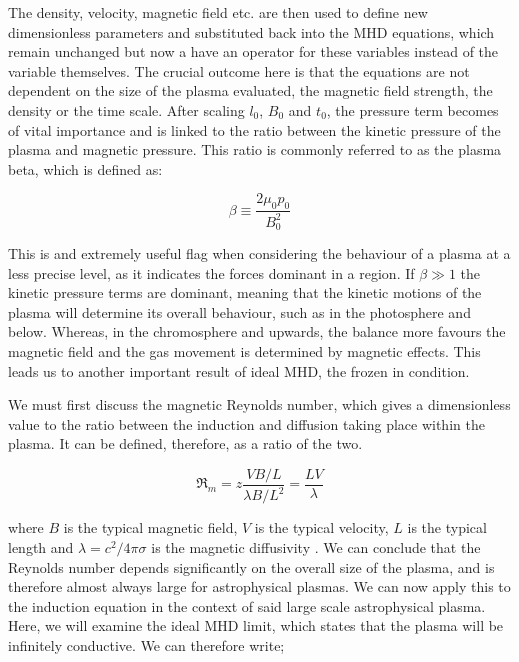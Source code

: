 \noindent The density, velocity, magnetic field etc. are then used to define new dimensionless parameters and substituted back into the MHD equations, which remain unchanged but now a have an operator for these variables instead of the variable themselves.
The crucial outcome here is that the equations are not dependent on the size of the plasma evaluated, the magnetic field strength, the density or the time scale.
After scaling $l_0$, $B_0$ and $t_0$, the pressure term becomes of vital importance and is linked to the ratio between the kinetic pressure of the plasma and magnetic pressure.
This ratio is commonly referred to as the plasma beta, which is defined as:

\begin{equation}
	\beta \equiv \frac{2\mu_0p_0}{B_0^2}
\end{equation} 

\noindent This is and extremely useful flag when considering the behaviour of a plasma at a less precise level, as it indicates the forces dominant in a region.
If $\beta \gg 1$ the kinetic pressure terms are dominant, meaning that the kinetic motions of the plasma will determine its overall behaviour, such as in the photosphere and below.
Whereas, in the chromosphere and upwards, the balance more favours the magnetic field and the gas movement is determined by magnetic effects.
This leads us to another important result of ideal MHD, the frozen in condition.

We must first discuss the magnetic Reynolds number, which gives a dimensionless value to the ratio between the induction and diffusion taking place within the plasma.
It can be defined, therefore, as a ratio of the two.

\begin{equation}
	\Re_m = z\frac{VB/L}{\lambda B/L^2} = \frac{LV}{\lambda} 
\end{equation}

\noindent where $B$ is the typical magnetic field, $V$ is the typical velocity, $L$ is the typical length and $\lambda = c^2/{4\pi\sigma}$ is the magnetic diffusivity \citep{Choudhuri1998}.
We can conclude that the Reynolds number depends significantly on the overall size of the plasma, and is therefore almost always large for astrophysical plasmas.
We can now apply this to the induction equation in the context of said large scale astrophysical plasma.
Here, we will examine the ideal MHD limit, which states that the plasma will be infinitely conductive. 
We can therefore write;

